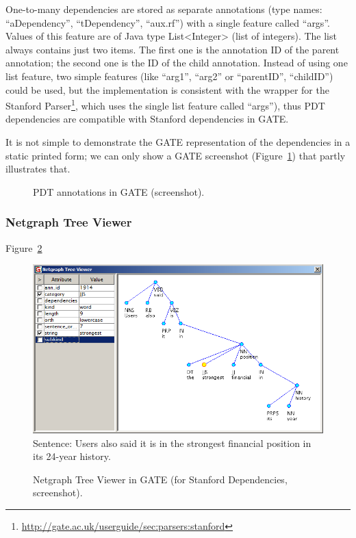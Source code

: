 One-to-many dependencies are stored as separate annotations (type names: ``aDependency'', ``tDependency'', ``aux.rf'') with a single feature called ``args''. Values of this feature are of Java type List<Integer> (list of integers). The list always contains just two items. The first one is the annotation ID of the parent annotation; the second one is the ID of the child annotation. Instead of using one list feature, two simple features (like ``arg1'', ``arg2'' or ``parentID'', ``childID'') could be used, but the implementation is consistent with the wrapper for the Stanford Parser\footnote{\url{http://gate.ac.uk/userguide/sec:parsers:stanford}}, which uses the single list feature called ``args''), thus PDT dependencies are compatible with Stanford dependencies in GATE.

It is not simple to demonstrate the GATE representation of the dependencies in a static printed form; we can only show a GATE screenshot (Figure~\ref{fig:PDT_GATE}) that partly illustrates that.


\begin{figure}
	\centering
	\caption{PDT annotations in GATE (screenshot).}
	\label{fig:PDT_GATE}
\end{figure}


\subsubsection{Netgraph Tree Viewer} \label{sec:ch60_GATE_Netgraph}

Figure~\ref{fig:GATE_Netgraph}

\begin{figure}
	\centering
		\includegraphics[width=0.7\hsize]{netgraph_stanford}
		\\Sentence: Users also said it is in the strongest financial position in its 24-year history.
	\caption{Netgraph Tree Viewer in GATE (for Stanford Dependencies, screenshot).}
	\label{fig:GATE_Netgraph}
\end{figure}



